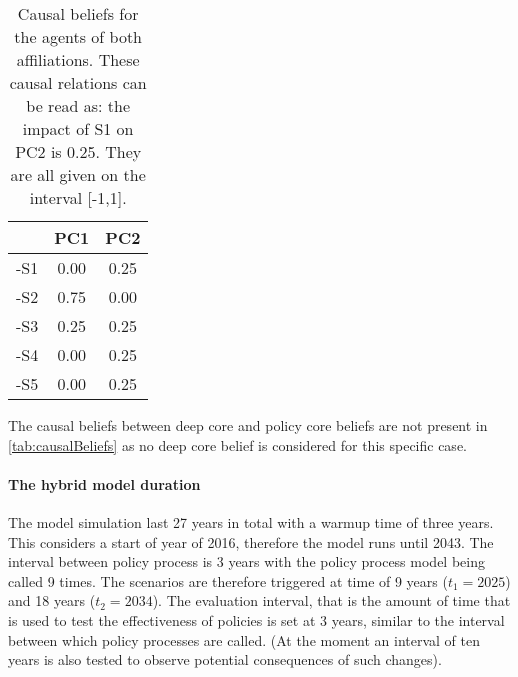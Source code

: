 
\begin{table}
\begin{center}
\begin{tabular}{ |c|c|c|}
 \hline
 	& PC1	& PC2		\\ \hline \hline
-S1 	& 0.00	& 0.25		\\ \hline
-S2 	& 0.75	& 0.00		\\ \hline
-S3 	& 0.25	& 0.25		\\ \hline
-S4 	& 0.00	& 0.25		\\ \hline
-S5 	& 0.00	& 0.25		\\ 
 \hline
\end{tabular}
\end{center}
\caption{Causal beliefs for the agents of both affiliations. These causal relations can be read as: the impact of S1 on PC2 is 0.25. They are all given on the interval [-1,1].}
\label{tab:causalBeliefs}
\end{table}

The causal beliefs between deep core and policy core beliefs are not present in \autoref{tab:causalBeliefs} as no deep core belief is considered for this specific case.


\paragraph{The hybrid model duration}

The model simulation last 27 years in total with a warmup time of three years. This considers a start of year of 2016, therefore the model runs until 2043. The interval between policy process is 3 years with the policy process model being called 9 times. The scenarios are therefore triggered at time of 9 years ($t_1 = 2025$) and 18 years ($t_2 = 2034$). The evaluation interval, that is the amount of time that is used to test the effectiveness of policies is set at 3 years, similar to the interval between which policy processes are called. (At the moment an interval of ten years is also tested to observe potential consequences of such changes).




